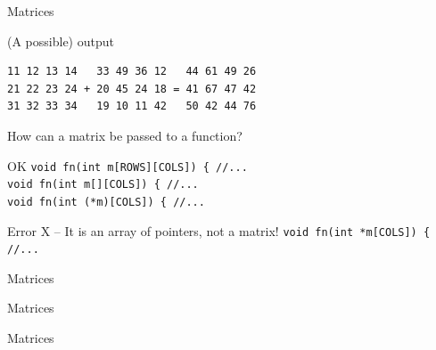 \documentclass[usenames,dvipsnames,aspectratio=169]{beamer}
\begin{document}
\begin{frame}[fragile]{Matrices}
  \begin{block}{(A possible) output}
    \begin{verbatim}
11 12 13 14   33 49 36 12   44 61 49 26 
21 22 23 24 + 20 45 24 18 = 41 67 47 42 
31 32 33 34   19 10 11 42   50 42 44 76
\end{verbatim}
  \end{block}
  \vfill
  How can a matrix be passed to a function?\\
  \begin{exampleblock}{OK \checkmark}
    \texttt{void fn(int m[ROWS][COLS]) \{ //...\\
    void fn(int m[][COLS]) \{ //...\\
    void fn(int (*m)[COLS]) \{ //...}
  \end{exampleblock}
  \begin{alertblock}{Error X -- It is an array of pointers, not a matrix!}
    \texttt{void fn(int *m[COLS]) \{ //...}
  \end{alertblock}
\end{frame}

\begin{frame}{Matrices}
  \begin{exampleblock}{}
    \vspace{-.3cm}
    
    \vspace{-.3cm}
  \end{exampleblock}
\end{frame}

\begin{frame}{Matrices}
  \scriptsize
  \begin{exampleblock}{}
    \scriptsize
    \vspace{-.3cm}
    
    \vspace{-.3cm}
  \end{exampleblock}
\end{frame}

\begin{frame}{Matrices}
  \scriptsize
  \begin{exampleblock}{}
    \scriptsize
    
  \end{exampleblock}
\end{frame}
\end{document}
